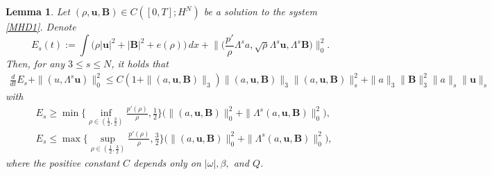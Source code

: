 \documentclass[12pt, reqno]{amsart}
\numberwithin{equation}{section}
\numberwithin{equation}{section}
\numberwithin{equation}{section}
\newtheorem{lemma}[theorem]{Lemma}
\numberwithin{equation}{section}
\theoremstyle{remark}
\def\u{ \mathbf{u} }
\def\b{ \mathbf{B} }
\begin{document}
\begin{lemma}\label{lemma-pri1}
Let $(\rho,\u,\b) \in C([0, T];H^N)$ be a solution to the  system \eqref{MHD1}. Denote
$$E_s(t):=\int\Big(\rho|\u|^2+|\b|^2+e(\rho)\Big)\,dx+\Big\|\big(\frac{p'}{\rho}\Lambda^sa,\sqrt{\rho}\Lambda^s\u,\Lambda^s\b\big)\Big\|^2_0.$$ Then, for any $3\leq s\leq N$, it holds that
\begin{align}\label{pri-2-2}
\frac{d}{dt}E_s+
\|(u,\Lambda^s\u)\|_0^2\leq C(1+\|(a,\u,\b)\|_3)\|(a,\u,\b)\|_3\|(a,\u,\b)\|^2_s+
\|a\|_3\|\b\|^{2}_3\|a\|_s\|\u\|_s
\end{align}
with
\begin{equation}
\begin{split}\label{bu-2026-6-27-1}& E_s\geq\min\{\inf_{\rho\in(\frac12,\frac32)}\frac{p'(\rho)}{\rho},\frac12\}\big(\|(a,\u,\b)\|^2_0+\|\Lambda^s(a,\u,\b)\|^2_0\big),\\&E_s\leq\max\{\sup_{\rho\in(\frac12,\frac32)}\frac{p'(\rho)}{\rho},\frac32\}\big(\|(a,\u,\b)\|^2_0+\|\Lambda^s(a,\u,\b)\|^2_0\big),\end{split}\end{equation}
where the positive constant $C$ depends only on $|\omega|,\beta,$ and $Q$.
\end{lemma}
\end{document}

